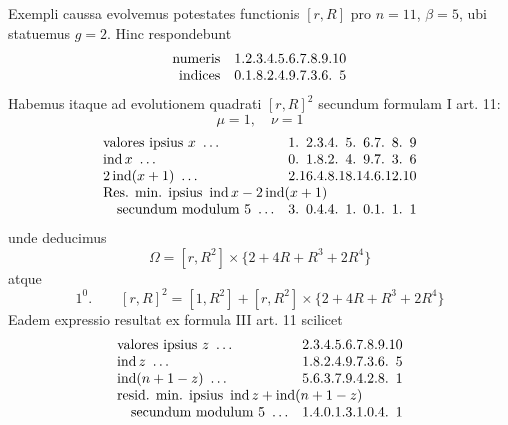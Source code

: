 Exempli caussa evolvemus potestates functionis $[r,R]$ pro $n=11$, $\beta=5$, ubi statuemus $g=2$. Hinc respondebunt
\[
\begin{array}{r@{\quad}r@{\pdot}r@{\pdot}r@{\pdot}r@{\pdot}r@{\pdot}r@{\pdot}r@{\pdot}r@{\pdot}r@{\pdot}r}
\text{numeris}&1&2&3&4&5&6&7&8&9&10\\
\text{indices}&0&1&8&2&4&9&7&3&6&5
\end{array}
\]
Habemus itaque ad evolutionem quadrati $[r,R]^2$ secundum formulam I art. 11:
\[
\mu=1,\quad\nu=1
\]
\[
\begin{array}{l@{\quad}r@{\pdot}r@{\pdot}r@{\pdot}r@{\pdot}r@{\pdot}r@{\pdot}r@{\pdot}r@{\pdot}r}
\text{valores ipsius }x\ \ldots&1&2&3&4&5&6&7&8&9\\
\operatorname{ind}x\ \ldots&0&1&8&2&4&9&7&3&6\\
2\operatorname{ind}(x+1)\ \ldots&2&16&4&8&18&14&6&12&10\\
\multicolumn{10}{l}{\text{Res. min. ipsius }\operatorname{ind}x-2\operatorname{ind}(x+1)}\\
\quad\text{secundum modulum }5\ \ldots&3&0&4&4&1&0&1&1&1
\end{array}
\]
unde deducimus
%
\[
\Omega=[r,R^2]\times\{2+4R+R^3+2R^4\}
\]
atque
\[
1^0.\qquad[r,R]^2=[1,R^2]+[r,R^2]\times\{2+4R+R^3+2R^4\}
\]
Eadem expressio resultat ex formula III art. 11 scilicet
\[
\begin{array}{l@{\quad}r@{\pdot}r@{\pdot}r@{\pdot}r@{\pdot}r@{\pdot}r@{\pdot}r@{\pdot}r@{\pdot}r}
\text{valores ipsius }z\ \ldots&2&3&4&5&6&7&8&9&10\\
\operatorname{ind}z\ \ldots&1&8&2&4&9&7&3&6&5\\
\operatorname{ind}(n+1-z)\ \ldots&5&6&3&7&9&4&2&8&1\\
\multicolumn{10}{l}{\text{resid. min. ipsius }\operatorname{ind}z+\operatorname{ind}(n+1-z)}\\
\quad\text{secundum modulum }5\ \ldots&1&4&0&1&3&1&0&4&1
\end{array}
\]

